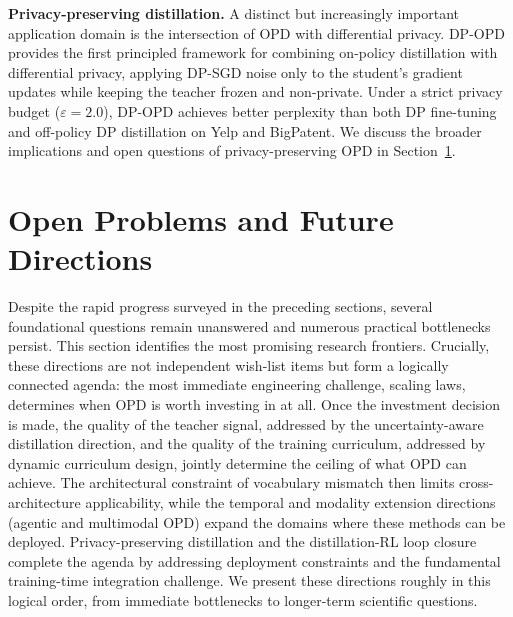 \documentclass{article} %
\begin{document}
\textbf{Privacy-preserving distillation.}
A distinct but increasingly important application domain is the intersection of OPD with differential privacy. DP-OPD~\citep{khadem2026dpopd} provides the first principled framework for combining on-policy distillation with differential privacy, applying DP-SGD noise only to the student's gradient updates while keeping the teacher frozen and non-private. Under a strict privacy budget ($\varepsilon = 2.0$), DP-OPD achieves better perplexity than both DP fine-tuning and off-policy DP distillation on Yelp and BigPatent. We discuss the broader implications and open questions of privacy-preserving OPD in Section~\ref{sec:future}.

\section{Open Problems and Future Directions}
\label{sec:future}

Despite the rapid progress surveyed in the preceding sections, several foundational questions remain unanswered and numerous practical bottlenecks persist. This section identifies the most promising research frontiers. Crucially, these directions are not independent wish-list items but form a logically connected agenda: the most immediate engineering challenge, scaling laws, determines when OPD is worth investing in at all. Once the investment decision is made, the quality of the teacher signal, addressed by the uncertainty-aware distillation direction, and the quality of the training curriculum, addressed by dynamic curriculum design, jointly determine the ceiling of what OPD can achieve. The architectural constraint of vocabulary mismatch then limits cross-architecture applicability, while the temporal and modality extension directions (agentic and multimodal OPD) expand the domains where these methods can be deployed. Privacy-preserving distillation and the distillation-RL loop closure complete the agenda by addressing deployment constraints and the fundamental training-time integration challenge. We present these directions roughly in this logical order, from immediate bottlenecks to longer-term scientific questions.
\end{document}
